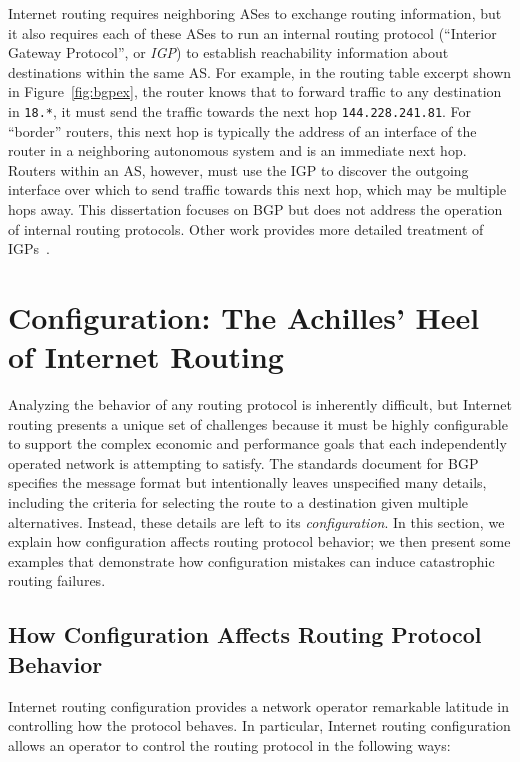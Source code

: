 Internet routing requires neighboring ASes to exchange routing
information, but it also requires each of these ASes to run an internal
routing protocol (``Interior Gateway Protocol'', or {\em IGP}) to
establish reachability information about destinations within the same
AS.  For example, in the routing table excerpt shown in
Figure~\ref{fig:bgpex}, the router knows that to forward traffic to any
destination in {\tt 18.*}, it must send the traffic towards the next hop
{\tt 144.228.241.81}.  For ``border'' routers, this next hop is typically
the address of an interface of the router in a neighboring autonomous
system and is an immediate next hop.  Routers within an AS, however,
must use the IGP to discover the outgoing
interface over which to send traffic towards this next hop, which may be
multiple hops away.  This dissertation focuses on BGP but does
not address the operation of internal routing protocols.  Other
work provides more detailed treatment of IGPs~\cite{Feldmann2001,
Shaikh2002, Shaikh2004}.


\section{Configuration: The Achilles' Heel of Internet Routing}
\label{sec:intro:config}

Analyzing the behavior of any routing protocol is inherently difficult,
but Internet routing presents a unique set of challenges because it must
be highly configurable to support the complex economic and performance
goals that each independently operated network is attempting to satisfy.
The standards document for BGP~\cite{rfc1771} specifies the message
format but intentionally leaves unspecified many details, including the
criteria for 
selecting the route to a destination given multiple alternatives.
Instead, these details are left to its {\em configuration}.  In this
section, we 
explain how configuration affects routing protocol behavior; we then
present some examples that demonstrate how configuration mistakes can
induce catastrophic routing failures.

\subsection{How Configuration Affects Routing Protocol Behavior}
\label{ssec:intro:config}

Internet routing configuration provides a network operator remarkable
latitude in controlling how the protocol behaves.  In particular,
Internet routing configuration allows an operator to control the routing
protocol in the following ways:

